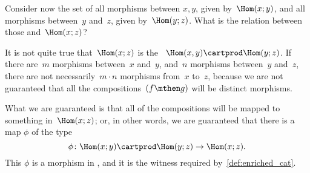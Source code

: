 {\begin{example}
        Consider now the set of all morphisms between $x, y$, given by~$\Hom(x;y)$, and all morphisms between~$y$ and~$z$, given by~$\Hom(y; z)$.
        What is the relation between those  and~$\Hom(x; z)$?

        It is not quite true that~$\Hom(x; z)$ is the ~$\Hom(x, y) \cartprod \Hom(y; z)$.
        If there are~$m$ morphisms between~$x$ and~$y$, and~$n$ morphisms between~$y$ and~$z$, there are not necessarily~$m \cdot n$ morphisms from~$x$ to~$z$, because we are not guaranteed that all the compositions~$(f\mthen g)$ will be distinct morphisms.

        What we are guaranteed is that all of the compositions will be mapped to something in~$\Hom(x; z)$; or, in other words, we are guaranteed that there is a map $\phi$ of the type
        \begin{equation}
            \phi \colon \Hom(x; y) \cartprod \Hom(y; z) \rightarrow \Hom(x; z).
        \end{equation}
        This $\phi$ is a morphism in \Set, and it is the witness required by~\cref{def:enriched_cat}.

    \end{example}
}


